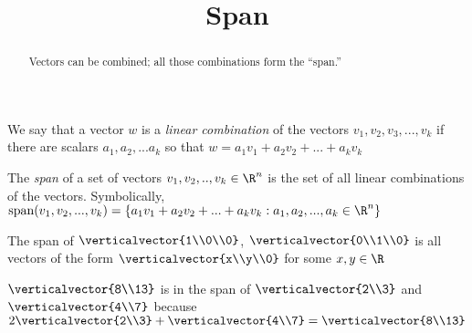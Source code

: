 \documentclass{ximera}
\title{Span}
\begin{document}
\begin{abstract}
  Vectors can be combined; all those combinations form the ``span.''
\end{abstract}

\begin{definition}
  We say that a vector $w$ is a \textit{linear combination} of the vectors $v_1,v_2,v_3,...,v_k$ if there are scalars $a_1,a_2,...a_k$ 
  so that $w = a_1v_1+a_2v_2+...+a_kv_k$
\end{definition}
  		
\begin{definition}
  The \textit{span} of a set of vectors $v_1,v_2, ..,v_k \in \R^n$ is the set of all linear combinations of the vectors.
  Symbolically, $\text{span}(v_1,v_2,...,v_k) = \{ a_1v_1+a_2v_2+...+a_kv_k : a_1,a_2, ...,a_k \in \R^n\}$
\end{definition}

\begin{example}
  The span of $\verticalvector{1\\0\\0}$, $\verticalvector{0\\1\\0}$ is all vectors of the form $\verticalvector{x\\y\\0}$ for some $x,y \in \R$
\end{example}

\begin{example}
  $\verticalvector{8\\13}$ is in the span of $\verticalvector{2\\3}$ and $\verticalvector{4\\7}$ because
  $2\verticalvector{2\\3} + \verticalvector{4\\7} = \verticalvector{8\\13}$ 
\end{example}
\end{document}
